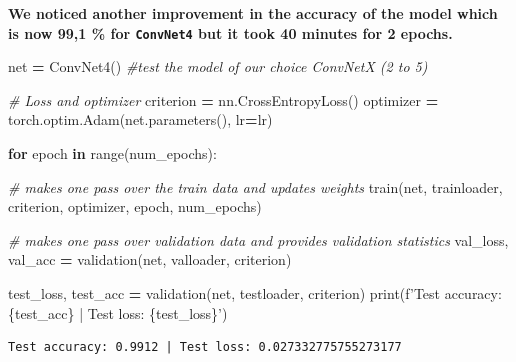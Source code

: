 \documentclass[10pt,a4paper]{article}
\newenvironment{Shaded}{\begin{snugshade}}{\end{snugshade}}
\newcommand{\BuiltInTok}[1]{#1}
\newcommand{\CommentTok}[1]{\textcolor[rgb]{0.56,0.35,0.01}{\textit{#1}}}
\newcommand{\ControlFlowTok}[1]{\textcolor[rgb]{0.13,0.29,0.53}{\textbf{#1}}}
\newcommand{\KeywordTok}[1]{\textcolor[rgb]{0.13,0.29,0.53}{\textbf{#1}}}
\newcommand{\NormalTok}[1]{#1}
\newcommand{\OperatorTok}[1]{\textcolor[rgb]{0.81,0.36,0.00}{\textbf{#1}}}
\newcommand{\SpecialCharTok}[1]{\textcolor[rgb]{0.00,0.00,0.00}{#1}}
\newcommand{\SpecialStringTok}[1]{\textcolor[rgb]{0.31,0.60,0.02}{#1}}
\theoremstyle{break}
\begin{document}
\textbf{\faArrowCircleRight{} We noticed another improvement in the accuracy of the model which is now 99,1 \% for \texttt{ConvNet4} but it took 40 minutes for 2 epochs.}

\begin{Shaded}
\begin{Highlighting}[]
\NormalTok{net }\OperatorTok{=}\NormalTok{ ConvNet4() }\CommentTok{#test the model of our choice ConvNetX (2 to 5)}

\CommentTok{# Loss and optimizer}
\NormalTok{criterion }\OperatorTok{=}\NormalTok{ nn.CrossEntropyLoss()}
\NormalTok{optimizer }\OperatorTok{=}\NormalTok{ torch.optim.Adam(net.parameters(), lr}\OperatorTok{=}\NormalTok{lr)}

\ControlFlowTok{for}\NormalTok{ epoch }\KeywordTok{in} \BuiltInTok{range}\NormalTok{(num_epochs):}
    
    \CommentTok{# makes one pass over the train data and updates weights}
\NormalTok{    train(net, trainloader, criterion, optimizer, epoch, num_epochs)}

    \CommentTok{# makes one pass over validation data and provides validation statistics}
\NormalTok{    val_loss, val_acc }\OperatorTok{=}\NormalTok{ validation(net, valloader, criterion)}
    
\end{Highlighting}
\end{Shaded}

\begin{Shaded}
\begin{Highlighting}[]
\NormalTok{test_loss, test_acc }\OperatorTok{=}\NormalTok{ validation(net, testloader, criterion)}
\BuiltInTok{print}\NormalTok{(}\SpecialStringTok{f'Test accuracy: }\SpecialCharTok{\{}\NormalTok{test_acc}\SpecialCharTok{\}}\SpecialStringTok{ | Test loss: }\SpecialCharTok{\{}\NormalTok{test_loss}\SpecialCharTok{\}}\SpecialStringTok{'}\NormalTok{)}
\end{Highlighting}
\end{Shaded}

\begin{verbatim}
Test accuracy: 0.9912 | Test loss: 0.027332775755273177
\end{verbatim}

\clearpage

\newpage

\hypertarget{appendix-appendix}{%
\appendix}


\setcounter{page}{0}
\end{document}
